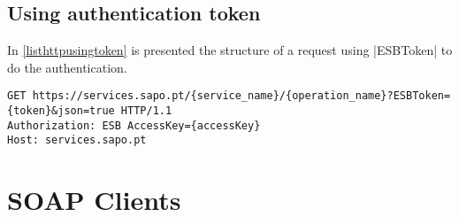 \subsection{Using authentication token}
\label{sec:chapter3:http:withtoken}

In \autoref{listhttpusingtoken} is presented the structure of a request using \icode|ESBToken| to do the authentication.

\begin{lstlisting}[label=listhttpusingtoken,caption=HTTP GET using \icode|ESBToken|]
GET https://services.sapo.pt/{service_name}/{operation_name}?ESBToken={token}&json=true HTTP/1.1
Authorization: ESB AccessKey={accessKey}
Host: services.sapo.pt
\end{lstlisting} 

\section{SOAP Clients}
\label{sec:chapter3:soap}

